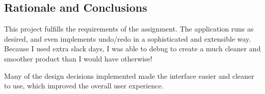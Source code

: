 \documentclass[11pt,letterpaper]{article}
\begin{document}
\subsection{Rationale and Conclusions}
This project fulfills the requirements of the assignment. The application runs as desired, and even implements undo/redo in a sophisticated and extensible way. Because I used extra slack days, I was able to debug to create a much cleaner and smoother product than I would have otherwise!

Many of the design decisions implemented made the interface easier and cleaner to use, which improved the overall user experience.
\end{document}

